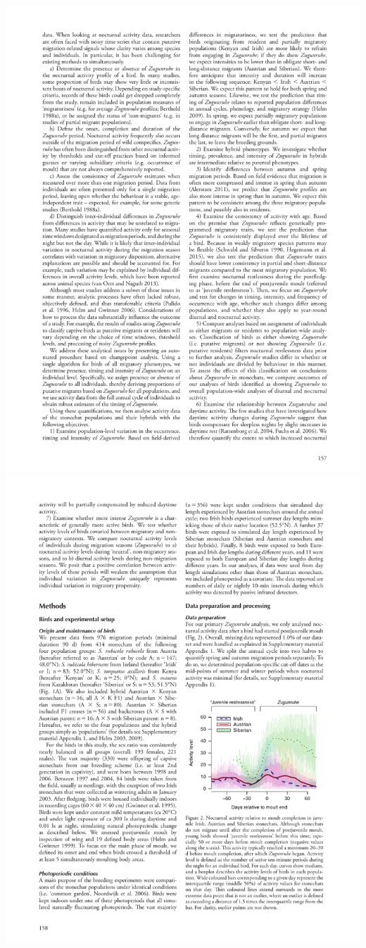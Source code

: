 \documentclass[a4paper, twoside]{templates/ociamthesis}
\begin{document}
\includegraphics[width=1\linewidth]{pdf_chapters/zug/zug_crop_Part03}
\includegraphics[width=1\linewidth]{pdf_chapters/zug/zug_crop_Part04}
\end{document}
